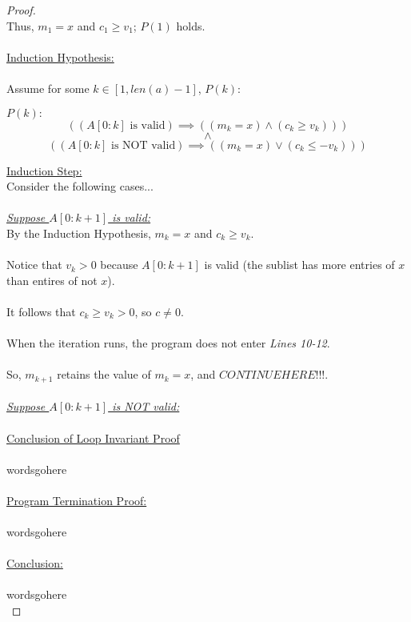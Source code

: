 \documentclass[12pt]{article}
\begin{document}
\begin{proof}
    \\
    Thus, $m_1 = x$ and $c_1 \geq v_1$; $P(1)$ holds. \\
    \\
    \underline{Induction Hypothesis:} \\
    \\
    Assume for some $k \in [1, len(a) - 1]$, $P(k)$:
    \begin{center}
        \(P(k):\)
        \[((A[0:k] \text{ is valid}) \implies ((m_k = x) \land (c_k \geq v_k)))\]
        \[\land\]
        \[((A[0:k] \text{ is NOT valid}) \implies ((m_k = x) \lor (c_k \leq -v_k)))\]
    \end{center}
    \underline{Induction Step:} \\
    Consider the following cases... \\
    \\
    \underline{\textit{Suppose $A[0:k + 1]$ is valid:}} \\
    By the Induction Hypothesis, $m_k = x$ and $c_k \geq v_k$. \\
    \\
    Notice that $v_k > 0$ because $A[0:k + 1]$ is valid (the sublist has more entries of $x$ than entires of not $x$). \\
    \\
    It follows that $c_k \geq v_k > 0$, so $c \neq 0$. \\
    \\
    When the iteration runs, the program does not enter \textit{Lines 10-12}. \\
    \\
    So, $m_{k + 1}$ retains the value of $m_k = x$, and $CONTINUE HERE!!!$. \\
    \\
    \underline{\textit{Suppose $A[0:k + 1]$ is NOT valid:}} \\
    \\
    \underline{Conclusion of Loop Invariant Proof} \\
    \\
    wordsgohere \\
    \\
    \underline{Program Termination Proof:} \\
    \\
    wordsgohere \\
    \\
    \underline{Conclusion:} \\
    \\
    wordsgohere \\
\end{proof}
\end{document}
